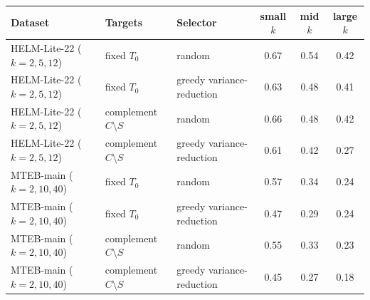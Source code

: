 \begin{tabular}{lllccc}\toprule
Dataset & Targets & Selector & small $k$ & mid $k$ & large $k$ \\\midrule
HELM-Lite-22 ($k{=}2,5,12$) & fixed $T_0$ & random & 0.67 & 0.54 & 0.42 \\
HELM-Lite-22 ($k{=}2,5,12$) & fixed $T_0$ & greedy variance-reduction & 0.63 & 0.48 & 0.41 \\
HELM-Lite-22 ($k{=}2,5,12$) & complement $C\!\setminus\!S$ & random & 0.66 & 0.48 & 0.42 \\
HELM-Lite-22 ($k{=}2,5,12$) & complement $C\!\setminus\!S$ & greedy variance-reduction & 0.61 & 0.42 & 0.27 \\
\midrule
MTEB-main ($k{=}2,10,40$) & fixed $T_0$ & random & 0.57 & 0.34 & 0.24 \\
MTEB-main ($k{=}2,10,40$) & fixed $T_0$ & greedy variance-reduction & 0.47 & 0.29 & 0.24 \\
MTEB-main ($k{=}2,10,40$) & complement $C\!\setminus\!S$ & random & 0.55 & 0.33 & 0.23 \\
MTEB-main ($k{=}2,10,40$) & complement $C\!\setminus\!S$ & greedy variance-reduction & 0.45 & 0.27 & 0.18 \\
\bottomrule
\end{tabular}
